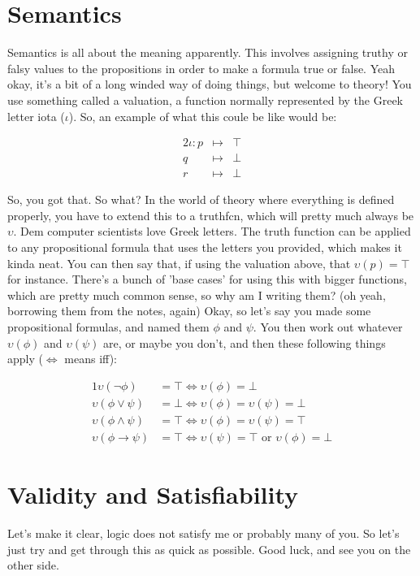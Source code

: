 \section{Semantics}
Semantics is all about the meaning apparently. This involves assigning truthy or falsy values to the propositions in order to make a formula true or false. Yeah okay, it's a bit of a long winded way of doing things, but welcome to theory! You use something called a \gls{valuation}, a function normally represented by the Greek letter iota ($\iota$). So, an example of what this coule be like would be:

\begin{alignat*}{2}
    \iota:p&\longmapsto&\top\\
    q&\longmapsto&\bot\\
    r&\longmapsto&\bot
\end{alignat*}

So, you got that. So what? In the world of theory where everything is defined properly, you have to extend this to a \gls{truthfcn}, which will pretty much always be $\upsilon$. Dem computer scientists love Greek letters. The truth function can be applied to any propositional formula that uses the letters you provided, which makes it kinda neat. You can then say that, if using the valuation above, that $\upsilon(p) = \top$ for instance. There's a bunch of 'base cases' for using this with bigger functions, which are pretty much common sense, so why am I writing them? (oh yeah, borrowing them from the notes, again) Okay, so let's say you made some propositional formulas, and named them $\phi$ and $\psi$. You then work out whatever $\upsilon(\phi)$ and $\upsilon(\psi)$ are, or maybe you don't, and then these following things apply ($\iff$ means iff):

\begin{alignat*}{1}
    \upsilon(\neg\phi) & = \top \iff \upsilon(\phi) = \bot\\
    \upsilon(\phi \lor \psi) & = \bot \iff \upsilon(\phi) = \upsilon(\psi) = \bot\\
    \upsilon(\phi \land \psi) & = \top \iff \upsilon(\phi) = \upsilon(\psi) = \top\\
    \upsilon(\phi \to \psi) & = \top \iff \upsilon(\psi) = \top \text{ or } \upsilon(\phi) = \bot
\end{alignat*}

\section{Validity and Satisfiability}
Let's make it clear, logic does not satisfy me or probably many of you. So let's just try and get through this as quick as possible. Good luck, and see you on the other side.
